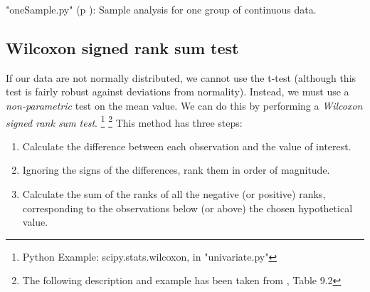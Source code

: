 \PyImg "oneSample.py" (p \pageref{py:oneSample}): Sample analysis for one group of continuous data.

%
%


\subsection{Wilcoxon signed rank sum test}

If our data are not normally distributed, we cannot use the t-test (although this test is fairly robust against deviations from normality). Instead, we must use a \emph{non-parametric} test on the mean value. We can do this by performing a \emph{Wilcoxon signed rank sum test}.
 \footnote{Python Example: scipy.stats.wilcoxon, in "univariate.py"}
\footnote{The following description and example has been taken from \cite{altman99}, Table 9.2}
This method has three steps:

\begin{enumerate}
  \item Calculate the difference between each observation and the value of interest.
  \item Ignoring the signs of the differences, rank them in order of magnitude.
  \item Calculate the sum of the ranks of all the negative (or positive) ranks, corresponding to the observations below (or above) the chosen hypothetical value.
\end{enumerate}

